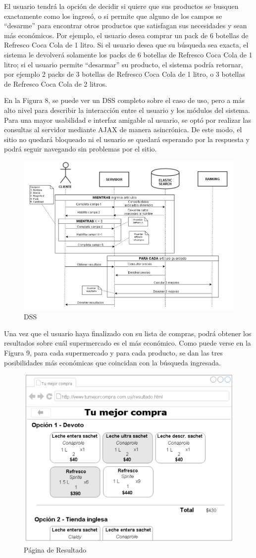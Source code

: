 \documentclass[12pt]{article} %
\begin{document}
El usuario tendrá la opción de decidir si quiere que sus productos se busquen exactamente como los ingresó, o si permite que alguno de los campos se “desarme” para encontrar otros productos que satisfagan sus necesidades y sean más económicos. 
Por ejemplo, el usuario desea comprar un pack de 6 botellas de Refresco Coca Cola de 1 litro. Si el usuario desea que su búsqueda sea exacta, el sistema le devolverá solamente los packs de 6 botellas de Refresco Coca Cola de 1 litro; si el usuario permite “desarmar” su producto, el sistema podría retornar, por ejemplo 2 packs de 3 botellas de Refresco Coca Cola de 1 litro, o 3 botellas de Refresco Coca Cola de 2 litros.


En la Figura 8, se puede ver un DSS completo sobre el caso de uso, pero a más alto nivel para describir la interacción entre el usuario y los módulos del sistema. Para una mayor usabilidad e interfaz amigable al usuario, se optó por realizar las consultas al servidor mediante AJAX de manera asincrónica. De este modo, el sitio no quedará bloqueado ni el usuario se quedará esperando por la respuesta y podrá seguir navegando sin problemas por el sitio.

\begin{figure}[H]
\includegraphics[height=0.40\textwidth]{DSS}
\centering
\caption{DSS}
\end{figure}

Una vez que el usuario haya finalizado con su lista de compras, podrá obtener los resultados sobre cuál supermercado es el más económico. Como puede verse en la Figura 9, para cada supermercado y para cada producto, se dan las tres posibilidades más económicas que coincidan con la búsqueda ingresada.

\begin{figure}[H]
\includegraphics[height=0.30\textwidth]{pag_resultado}
\centering
\caption{Página de Resultado}
\end{figure}
\end{document}
